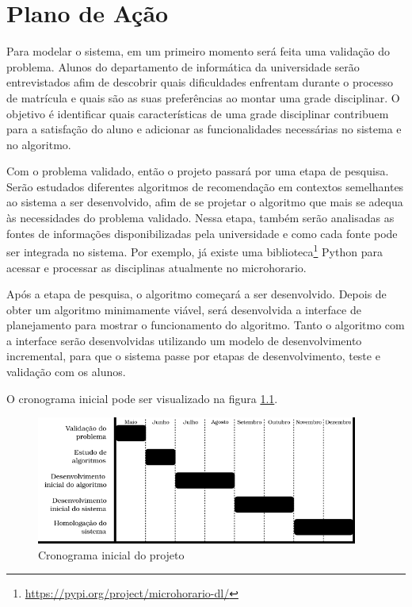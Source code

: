 
\chapter{Plano de Ação}
\label{cha:Plano de Ação}

Para modelar o sistema, em um primeiro momento será feita uma validação do problema. Alunos do departamento de informática da universidade serão entrevistados afim de descobrir quais dificuldades enfrentam durante o processo de matrícula e quais são as suas preferências ao montar uma grade disciplinar. O objetivo é identificar quais características de uma grade disciplinar contribuem para a satisfação do aluno e adicionar as funcionalidades necessárias no sistema e no algoritmo.

Com o problema validado, então o projeto passará por uma etapa de pesquisa. Serão estudados diferentes algoritmos de recomendação em contextos semelhantes ao sistema a ser desenvolvido, afim de se projetar o algoritmo que mais se adequa às necessidades do problema validado. Nessa etapa, também serão analisadas as fontes de informações disponibilizadas pela universidade e como cada fonte pode ser integrada no sistema. Por exemplo, já existe uma biblioteca\footnote{\url{https://pypi.org/project/microhorario-dl/}} Python para acessar e processar as disciplinas atualmente no microhorario.

Após a etapa de pesquisa, o algoritmo começará a ser desenvolvido. 
Depois de obter um algoritmo minimamente viável, será desenvolvida a interface de planejamento para mostrar o funcionamento do algoritmo. 
Tanto o algoritmo com a interface serão desenvolvidas utilizando um modelo de desenvolvimento incremental, para que o sistema passe por etapas de desenvolvimento, teste e validação com os alunos. 

O cronograma inicial pode ser visualizado na figura \ref{fig-cronograma}.

\begin{figure}[h]
    \begin{center}
    \includegraphics[width=300pt]{figuras/cronograma}
    \caption{Cronograma inicial do projeto}
    \label{fig-cronograma}
    \end{center}
\end{figure}